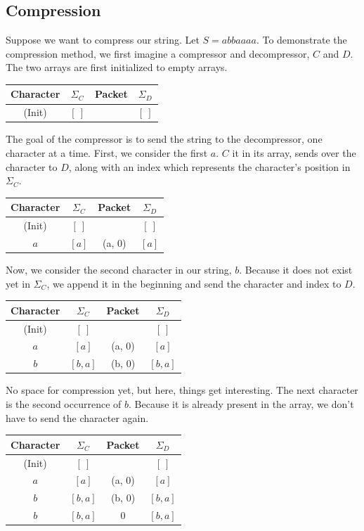 \documentclass[10pt]{article}
\begin{document}
\subsection*{Compression}
Suppose we want to compress our string.  Let $S = abbaaaa$.  To demonstrate the compression method, we first imagine a compressor and decompressor, $C$ and $D$.  The two arrays are first initialized to empty arrays.
\begin{center}
\begin{tabular}{|c|c|c|c|}
    \hline
    Character & $\Sigma_C$ & Packet & $\Sigma_D$ \\ \hline
    (Init) & $[~]$ & & $[~]$ \\ \hline
\end{tabular}
\end{center}
The goal of the compressor is to send the string to the decompressor, one character at a time.  First, we consider the first $a$.  $C$ it in its array, sends over the character to $D$, along with an index which represents the character's position in $\Sigma_C$.
\begin{center}
\begin{tabular}{|c|c|c|c|}
    \hline
    Character & $\Sigma_C$ & Packet & $\Sigma_D$ \\ \hline
    (Init) & $[~]$ & & $[~]$ \\ \hline
    $a$ & $[a]$ & (a, 0) & $[a]$ \\ \hline
\end{tabular}
\end{center}
Now, we consider the second character in our string, $b$.  Because it does not exist yet in $\Sigma_C$, we append it in the beginning and send the character and index to $D$.
\begin{center}
\begin{tabular}{|c|c|c|c|}
    \hline
    Character & $\Sigma_C$ & Packet & $\Sigma_D$ \\ \hline
    (Init) & $[~]$ & & $[~]$ \\ \hline
    $a$ & $[a]$ & (a, 0) & $[a]$ \\ \hline
    $b$ & $[b, a]$ & (b, 0) & $[b, a]$ \\ \hline
\end{tabular}
\end{center}
No space for compression yet, but here, things get interesting.  The next character is the second occurrence of $b$.  Because it is already present in the array, we don't have to send the character again.
\begin{center}
\begin{tabular}{|c|c|c|c|}
    \hline
    Character & $\Sigma_C$ & Packet & $\Sigma_D$ \\ \hline
    (Init) & $[~]$ & & $[~]$ \\ \hline
    $a$ & $[a]$ & (a, 0) & $[a]$ \\ \hline
    $b$ & $[b, a]$ & (b, 0) & $[b, a]$ \\ \hline
    $b$ & $[b, a]$ & 0 & $[b, a]$ \\ \hline
\end{tabular}
\end{center}
\end{document}
